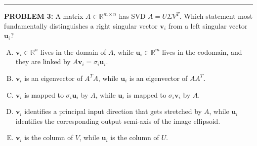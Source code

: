 \documentclass[12pt]{amsart}
\newcommand{\divider}{
  \vspace{-1em} %
  \noindent
  \raisebox{-0.15ex}{\textbullet}%
  \hspace{0.5em}%
  \rule[0.5ex]{0.95\textwidth}{1.0pt}%
  \hspace{0.5em}%
  \raisebox{-0.15ex}{\textbullet}%
  \vspace{0em} %
}
\begin{document}
\divider

{\bf PROBLEM 3:}
A matrix $A \in \mathbb{R}^{m \times n}$ has SVD $A = U\Sigma V^T$. Which statement most fundamentally distinguishes a right singular vector $\mathbf{v}_i$ from a left singular vector $\mathbf{u}_i$?

\begin{enumerate}[(A)]
\item $\mathbf{v}_i \in \mathbb{R}^n$ lives in the domain of $A$, while $\mathbf{u}_i \in \mathbb{R}^m$ lives in the codomain, and they are linked by $A\mathbf{v}_i = \sigma_i \mathbf{u}_i$.
\item $\mathbf{v}_i$ is an eigenvector of $A^TA$, while $\mathbf{u}_i$ is an eigenvector of $AA^T$.
\item $\mathbf{v}_i$ is mapped to $\sigma_i \mathbf{u}_i$ by $A$, while $\mathbf{u}_i$ is mapped to $\sigma_i \mathbf{v}_i$ by $A$.
\item $\mathbf{v}_i$ identifies a principal input direction that gets stretched by $A$, while $\mathbf{u}_i$ identifies the corresponding output semi-axis of the image ellipsoid.
\item $\mathbf{v}_i$ is the column of $V$, while $\mathbf{u}_i$ is the column of $U$.
\end{enumerate}
\end{document}
